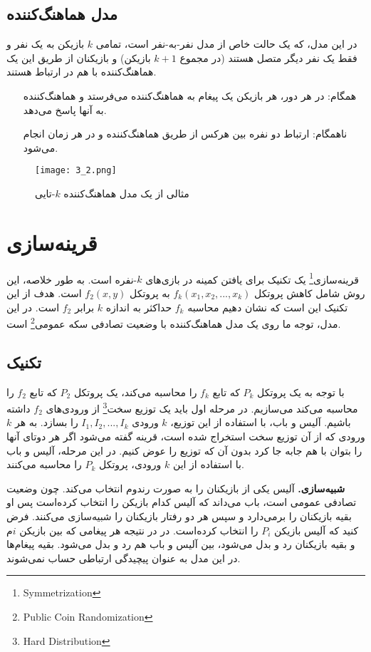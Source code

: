 \subsection{مدل هماهنگ‌کننده}
 در این مدل، که یک حالت خاص از مدل نفر-به-نفر است، تمامی $k$ بازیکن به یک نفر و فقط یک نفر دیگر متصل هستند (در مجموع $k+1$ بازیکن) و بازیکنان از طریق این یک هماهنگ‌کننده با هم در ارتباط هستند. 
 \begin{itemize}
 	\item [همگام:] در هر دور، هر بازیکن یک پیغام به هماهنگ‌کننده می‌فرستد و هماهنگ‌کننده به آنها پاسخ می‌دهد. 
 	\item [ناهمگام:] ارتباط دو نفره بین هرکس از طریق هماهنگ‌کننده و در هر زمان انجام می‌شود. 
 \end{itemize}
\begin{figure}[h]
	\caption{مثالی از یک مدل هماهنگ‌کننده $k$-تایی}
	\centering
	\texttt{[image: 3\_2.png]}
\end{figure}
\section{قرینه‌سازی}
قرینه‌سازی\footnote{Symmetrization} یک تکنیک برای یافتن کمینه در بازی‌های $k$-نفره است.\cite{zhang11} به طور خلاصه، این روش شامل کاهش پروتکل $f_{k}(x_{1},x_{2},...,x_{k})$ به پروتکل   $f_{2}(x,y)$ است. هدف از این تکنیک این است که نشان دهیم محاسبه $f_{k}$ حداکثر به اندازه $k$ برابر $f_{2}$ است. در این مدل، توجه ما روی یک مدل هماهنگ‌کننده با وضعیت تصادفی سکه عمومی\footnote{Public Coin Randomization} است. 

\subsection{تکنیک}
با توجه به یک پروتکل $P_{k}$ که تابع  $f_{k}$ را محاسبه می‌کند، یک پروتکل $P_{2}$ که تابع $f_{2}$ را محاسبه می‌کند می‌سازیم. در مرحله اول باید یک توزیع سخت\footnote{Hard Distribution} از ورودی‌های $f_{2}$ داشته باشیم. آلیس و باب، با استفاده از این توزیع، $k$ ورودی $I_{1}, I_{2}, ..., I_{k}$ را بسازد. به هر $k$ ورودی که از آن توزیع سخت استخراج شده است، قرینه گفته می‌شود اگر هر دوتای آنها را بتوان با هم جابه جا کرد بدون آن که توزیع را عوض کنیم. در این مرحله، آلیس و باب با استفاده از این $k$ ورودی، پروتکل $P_{k}$ را محاسبه می‌کنند. 

\textbf{شبیه‌سازی.} 
آلیس یکی از بازیکنان را به صورت رندوم انتخاب می‌کند. چون وضعیت تصادفی عمومی است، باب می‌د‌‌اند که آلیس کدام بازیکن را انتخاب کرده‌است پس او بقیه بازیکنان را برمی‌د‌ارد و سپس هر دو رفتار بازیکنان را شبیه‌سازی می‌کنند. فرض کنید که آلیس بازیکن $P_{i}$ را انتخاب کرده‌است. در در نتیجه هر پیغامی که بین بازیکن $i$م و بقیه بازیکنان رد و بدل می‌شود، بین آلیس و باب هم رد و بدل می‌شود. بقیه پیغام‌ها در این مدل به عنوان پیچیدگی ارتباطی حساب نمی‌شوند. 
 
